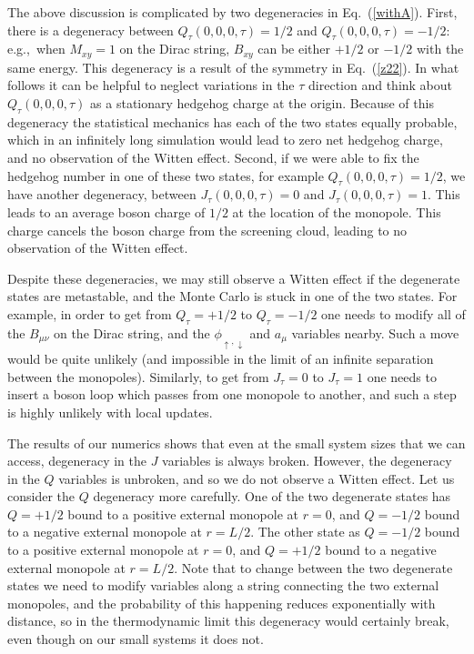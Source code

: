 The above discussion is complicated by two degeneracies in Eq.~(\ref{withA}). First, there is a degeneracy between $Q_\tau(0,0,0,\tau)=1/2$ and $Q_\tau(0,0,0,\tau)=-1/2$: e.g.,~when $M_{xy}=1$ on the Dirac string, $B_{xy}$ can be either $+1/2$ or $-1/2$ with the same energy. This degeneracy is a result of the symmetry in Eq.~(\ref{z22}). In what follows it can be helpful to neglect variations in the $\tau$ direction and think about $Q_\tau(0,0,0,\tau)$ as a stationary hedgehog charge at the origin. Because of this degeneracy the statistical mechanics has each of the two states equally probable, which in an infinitely long simulation would lead to zero net hedgehog charge, and no observation of the Witten effect.
Second, if we were able to fix the hedgehog number in one of these two states, for example $Q_\tau(0,0,0,\tau) = 1/2$, we have another degeneracy, between $J_\tau(0,0,0,\tau) = 0$ and $J_\tau(0,0,0,\tau) = 1$. This leads to an average boson charge of $1/2$ at the location of the  monopole. This charge cancels the boson charge from the screening cloud, leading to no observation of the Witten effect. 

Despite these degeneracies, we may still observe a Witten effect if the degenerate states are metastable, and the Monte Carlo is stuck in one of the two states. For example, in order to get from $Q_\tau=+1/2$ to $Q_\tau=-1/2$ one needs to modify all of the $B_{\mu\nu}$ on the Dirac string, and the $\phi_{\uparrow,\downarrow}$ and $a_{\mu}$ variables nearby. Such a move would be quite unlikely (and impossible in the limit of an infinite separation between the monopoles). Similarly, to get from $J_\tau=0$ to $J_\tau=1$ one needs to insert a boson loop which passes from one monopole to another, and such a step is highly unlikely with local updates.

The results of our numerics shows that even at the small system sizes that we can access, degeneracy in the $J$ variables is always broken. However, the degeneracy in the $Q$ variables is unbroken, and so we do not observe a Witten effect. Let us consider the $Q$ degeneracy more carefully. One of the two degenerate states has $Q=+1/2$ bound to a positive external monopole at $r=0$, and $Q=-1/2$ bound to a negative external monopole at $r=L/2$. The other state as $Q=-1/2$ bound to a positive external monopole at $r=0$, and $Q=+1/2$ bound to a negative external monopole at $r=L/2$. Note that to change between the two degenerate states we need to modify variables along a string connecting the two external monopoles, and the probability of this happening reduces exponentially with distance, so in the thermodynamic limit this degeneracy would certainly break, even though on our small systems it does not. 

